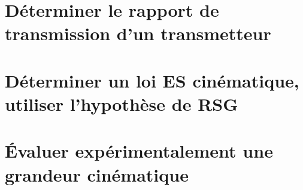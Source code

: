 \graphicspath{{\repStyle/png/}{../CIN/CIN-02-VitesseAcceleration/08_RR3D_02/images/}} 
 
 
\graphicspath{{\repStyle/png/}{../CIN/CIN-02-VitesseAcceleration/09_RT_RSG/images/}} 
 
 
\graphicspath{{\repStyle/png/}{../CIN/CIN-02-VitesseAcceleration/10_PompePalette/images/}} 
 
 
\graphicspath{{\repStyle/png/}{../CIN/CIN-02-VitesseAcceleration/11_PompePistonsRadiaux/images/}} 
 
 
\graphicspath{{\repStyle/png/}{../CIN/CIN-02-VitesseAcceleration/12_BielleManivelle/images/}} 
 
 
\graphicspath{{\repStyle/png/}{../CIN/CIN-02-VitesseAcceleration/13_TransfoMouvement/images/}} 
 
 
\graphicspath{{\repStyle/png/}{../CIN/CIN-02-VitesseAcceleration/14_Sympact/images/}} 
 
 
\graphicspath{{\repStyle/png/}{../CIN/CIN-02-VitesseAcceleration/15_SympactGalet/images/}} 
 
 
\graphicspath{{\repStyle/png/}{../CIN/CIN-02-VitesseAcceleration/16_Poussoir/images/}} 
 
 
\graphicspath{{\repStyle/png/}{../CIN/CIN-02-VitesseAcceleration/17_4Barres/images/}} 
 
 
\graphicspath{{\repStyle/png/}{../CIN/CIN-02-VitesseAcceleration/18_Maxpid/images/}} 
 
 
\graphicspath{{\repStyle/png/}{../CIN/CIN-02-VitesseAcceleration/46_RR_RSG/images/}} 
 
 
\section{Déterminer le rapport de transmission d'un transmetteur} 
\section{Déterminer un loi ES cinématique, utiliser l'hypothèse de RSG} 
\section{Évaluer expérimentalement une grandeur cinématique} 
